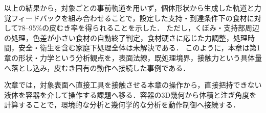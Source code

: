 \begin{revisionblock}
以上の結果から，対象ごとの事前軌道を用いず，個体形状から生成した軌道と力覚フィードバックを組み合わせることで，設定した支持・到達条件下の食材に対して78--95\%の皮むき率を得られることを示した．
ただし，くぼみ・支持部周辺の処理，色差が小さい食材の自動終了判定，食材硬さに応じた力調整，処理時間，安全・衛生を含む家庭下処理全体は未解決である．
このように，本章は第1章の形状・力学という分析観点を，表面法線，既処理境界，接触力という具体量へ落とし込み，皮むき固有の動作へ接続した事例である．
\end{revisionblock}

次章では，対象表面へ直接工具を接触させる本章の操作から，直接把持できない液体を容器を介して操作する課題へ移る．容器の3D幾何から体積と注ぎ角度を計算することで，環境的な分析と幾何学的な分析を動作制御へ接続する．
